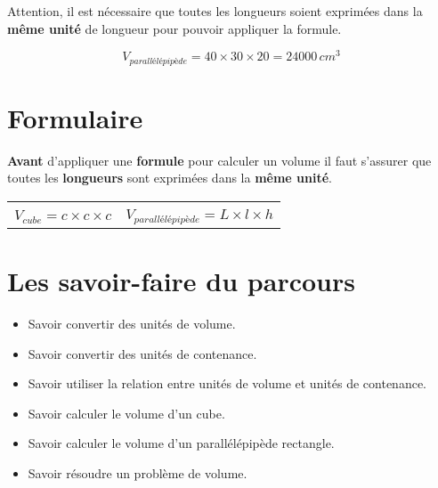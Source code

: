 \documentclass[a4paper,dvipsnames]{article}
\begin{document}
\begin{Rq}
Attention, il est nécessaire que toutes les longueurs soient exprimées dans la \textbf{même unité} de longueur pour pouvoir appliquer la formule.
\end{Rq}

\begin{Ex}
\begin{center}
\end{center}
\[V_{parallélépipède}=40\times 30\times 20=24000\,cm^3\]
\end{Ex}

\section{Formulaire}

\begin{Att}
\textbf{Avant} d'appliquer une \textbf{formule} pour calculer un volume il faut s'assurer que toutes les \textbf{longueurs} sont exprimées dans la \textbf{même unité}.
\end{Att}

\begin{tabular}{M{.5\textwidth}|M{.5\textwidth}}
\begin{center}
\end{center} & 
\begin{center}
\end{center} \\
\[V_{cube}=c\times c\times c\] & \[V_{parallélépipède}=L\times l\times h\]
\end{tabular}

\section{Les savoir-faire du parcours}

\begin{CpsCol}
\begin{itemize}
\item Savoir convertir des unités de volume.
\item Savoir convertir des unités de contenance.
\item Savoir utiliser la relation entre unités de volume et unités de contenance.
\item Savoir calculer le volume d'un cube.
\item Savoir calculer le volume d'un parallélépipède rectangle.
\item Savoir résoudre un problème de volume.
\end{itemize}
\end{CpsCol}
\end{document}
